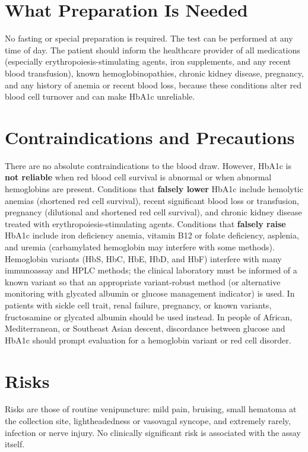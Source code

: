 \section*{What Preparation Is Needed}
No fasting or special preparation is required. The test can be performed at any time of day. The patient should inform the healthcare provider of all medications (especially erythropoiesis-stimulating agents, iron supplements, and any recent blood transfusion), known hemoglobinopathies, chronic kidney disease, pregnancy, and any history of anemia or recent blood loss, because these conditions alter red blood cell turnover and can make HbA1c unreliable.

\section*{Contraindications and Precautions}
There are no absolute contraindications to the blood draw. However, HbA1c is \textbf{not reliable} when red blood cell survival is abnormal or when abnormal hemoglobins are present. Conditions that \textbf{falsely lower} HbA1c include hemolytic anemias (shortened red cell survival), recent significant blood loss or transfusion, pregnancy (dilutional and shortened red cell survival), and chronic kidney disease treated with erythropoiesis-stimulating agents. Conditions that \textbf{falsely raise} HbA1c include iron deficiency anemia, vitamin B12 or folate deficiency, asplenia, and uremia (carbamylated hemoglobin may interfere with some methods). Hemoglobin variants (HbS, HbC, HbE, HbD, and HbF) interfere with many immunoassay and HPLC methods; the clinical laboratory must be informed of a known variant so that an appropriate variant-robust method (or alternative monitoring with glycated albumin or glucose management indicator) is used. In patients with sickle cell trait, renal failure, pregnancy, or known variants, fructosamine or glycated albumin should be used instead. In people of African, Mediterranean, or Southeast Asian descent, discordance between glucose and HbA1c should prompt evaluation for a hemoglobin variant or red cell disorder.

\section*{Risks}
Risks are those of routine venipuncture: mild pain, bruising, small hematoma at the collection site, lightheadedness or vasovagal syncope, and extremely rarely, infection or nerve injury. No clinically significant risk is associated with the assay itself.

